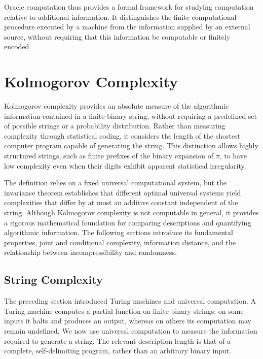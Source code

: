 Oracle computation thus provides a formal framework for studying computation relative to additional information. It distinguishes the finite computational procedure executed by a machine from the information supplied by an external source, without requiring that this information be computable or finitely encoded.

%
%

\section{Kolmogorov Complexity}
\label{sec:kolmogorov_complexity}

Kolmogorov complexity provides an absolute measure of the algorithmic information contained in a finite binary string, without requiring a predefined set of possible strings or a probability distribution. Rather than measuring complexity through statistical coding, it considers the length of the shortest computer program capable of generating the string. This distinction allows highly structured strings, such as finite prefixes of the binary expansion of $\pi$, to have low complexity even when their digits exhibit apparent statistical irregularity.

The definition relies on a fixed universal computational system, but the invariance theorem establishes that different optimal universal systems yield complexities that differ by at most an additive constant independent of the string. Although Kolmogorov complexity is not computable in general, it provides a rigorous mathematical foundation for comparing descriptions and quantifying algorithmic information. The following sections introduce its fundamental properties, joint and conditional complexity, information distance, and the relationship between incompressibility and randomness.



\subsection*{String Complexity}
\label{sec:strings_complexity}

The preceding section introduced Turing machines and universal computation. A Turing machine computes a partial function on finite binary strings: on some inputs it halts and produces an output, whereas on others its computation may remain undefined. We now use universal computation to measure the information required to generate a string. The relevant description length is that of a complete, self-delimiting program, rather than an arbitrary binary input.

